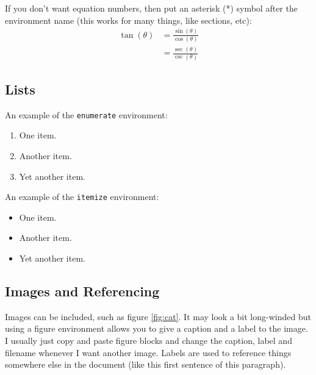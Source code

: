 \documentclass[12pt]{article}
\begin{document}
If you don't want equation numbers, then put an asterisk (*) symbol after the environment name (this works for many things, like sections, etc):
\begin{align*}
	\tan(\theta) &= \frac{\sin(\theta)}{\cos(\theta)} \\
		&= \frac{\sec(\theta)}{\csc(\theta)}
\end{align*}

\subsection{Lists}

An example of the \texttt{enumerate} environment:
\begin{enumerate}
	\item One item.
	\item Another item.
	\item Yet another item.
\end{enumerate}

An example of the \texttt{itemize} environment:
\begin{itemize}
	\item One item.
	\item Another item.
	\item Yet another item.
\end{itemize}

\subsection{Images and Referencing}

Images can be included, such as figure \ref{fig:cat}. It may look a bit long-winded but using a figure environment allows you to give a caption and a label to the image. I usually just copy and paste figure blocks and change the caption, label and filename whenever I want another image. Labels are used to reference things somewhere else in the document (like this first sentence of this paragraph).
\end{document}
